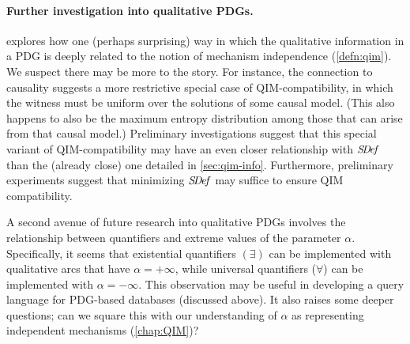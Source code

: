 \paragraph{Further investigation into qualitative PDGs.}
 explores how one (perhaps surprising) way in which the qualitative information in a PDG is deeply related to the notion of mechanism independence (\cref{defn:qim}).
We suspect there may be more to the story. 
For instance, the connection to causality suggests a more restrictive special case of QIM-compatibility, in which the witness must be uniform over the solutions
 of some causal model. (This also happens to also be the maximum entropy distribution among those that can arise from that causal model.) 
Preliminary investigations suggest that this special variant of QIM-compatibility may have an even closer relationship with $\mathit{S\mskip-3.5muD\mskip-2.5mue\mskip-1.5muf}$ than the (already close) one detailed in \cref{sec:qim-info}.
Furthermore, preliminary experiments suggest that minimizing $\mathit{S\mskip-3.5muD\mskip-2.5mue\mskip-1.5muf}$ may suffice to ensure QIM compatibility. 

A second avenue of future research into qualitative PDGs involves the relationship between quantifiers and extreme values of the parameter $\alpha$. 
Specifically, it seems that existential quantifiers $(\exists)$ can be implemented with qualitative arcs that have $\alpha = +\infty$, while universal quantifiers ($\forall$) can be implemented with $\alpha = -\infty$. 
This observation may be useful in developing a query language for PDG-based databases (discussed above).
It also raises some deeper questions;
can we square this with our understanding of $\alpha$ as representing independent mechanisms (\cref{chap:QIM})?



